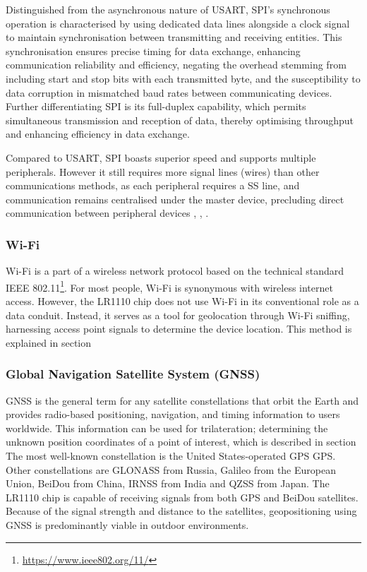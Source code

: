Distinguished from the asynchronous nature of \ac{USART}, \ac{SPI}'s synchronous operation is characterised by using dedicated data lines alongside a clock signal to maintain synchronisation between transmitting and receiving entities. This synchronisation ensures precise timing for data exchange, enhancing communication reliability and efficiency, negating the overhead stemming from including start and stop bits with each transmitted byte, and the susceptibility to data corruption in mismatched baud rates between communicating devices.
Further differentiating \ac{SPI} is its full-duplex capability, which permits simultaneous transmission and reception of data, thereby optimising throughput and enhancing efficiency in data exchange.

Compared to \ac{USART}, \ac{SPI} boasts superior speed and supports multiple peripherals. However it still requires more signal lines (wires) than other communications methods, as each peripheral requires a \ac{SS} line, and communication remains centralised under the master device, precluding direct communication between peripheral devices \cite{SPI_analog}, \cite{SPI_sparkfun}, \cite{SPI_wiki}.

\subsubsection{Wi-Fi}
Wi-Fi is a part of a wireless network protocol based on the technical standard IEEE 802.11\footnote{\url{https://www.ieee802.org/11/}}. For most people, Wi-Fi is synonymous with wireless internet access. However, the LR1110 chip does not use Wi-Fi in its conventional role as a data conduit. Instead, it serves as a tool for geolocation through Wi-Fi sniffing, harnessing access point signals to determine the device location. This method is explained in section %

\subsubsection{Global Navigation Satellite System (GNSS)}
\ac{GNSS} is the general term for any satellite constellations that orbit the Earth and provides radio-based positioning, navigation, and timing information to users worldwide. This information can be used for trilateration; determining the unknown position coordinates of a point of interest, which is described in section %
The most well-known constellation is the United States-operated \ac{GPS} \ac{GPS}. Other constellations are GLONASS from Russia, Galileo from the European Union, BeiDou from China, IRNSS from India and QZSS from Japan. The LR1110 chip is capable of receiving signals from both GPS and BeiDou satellites.
Because of the signal strength and distance to the satellites, geopositioning using GNSS is predominantly viable in outdoor environments.


